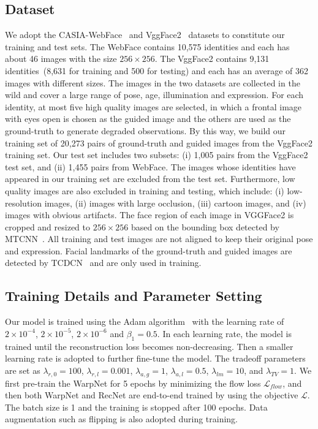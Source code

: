 \documentclass[runningheads]{llncs}
\begin{document}
\subsection{Dataset}
We adopt the CASIA-WebFace~\cite{Webface} and VggFace2~\cite{Vggface2} datasets to constitute our training and test sets.
The WebFace contains 10,575 identities and each has about 46 images with the size $256 \times 256$.
The VggFace2 contains 9,131 identities~(8,631 for training and 500 for testing) and each has an average of 362 images with different sizes.
The images in the two datasets are collected in the wild and cover a large range of pose, age, illumination and expression.
For each identity, at most five high quality images are selected, in which a frontal image with eyes open is chosen as the guided image and the others are used as the ground-truth to generate degraded observations.
By this way, we build our training set of 20,273 pairs of ground-truth and guided images from the VggFace2 training set.
Our test set includes two subsets: (i) 1,005 pairs from the VggFace2 test set, and (ii) 1,455 pairs from WebFace.
The images whose identities have appeared in our training set are excluded from the test set.
Furthermore, low quality images are also excluded in training and testing, which include: (i) low-resolution images, (ii) images with large occlusion, (iii) cartoon images, and (iv) images with obvious artifacts.
The face region of each image in VGGFace2 is cropped and resized to $256 \times 256$ based on the bounding box detected by MTCNN~\cite{MTCNN}.
All training and test images are not aligned to keep their original pose and expression.
Facial landmarks of the ground-truth and guided images are detected by TCDCN~\cite{TCDCN} and are only used in training.

\subsection{Training Details and Parameter Setting}
Our model is trained using the Adam algorithm~\cite{kingma2014adam} with the learning rate of $2 \times {10^{ - 4}}$, $2 \times {10^{ - 5}}$, $2 \times {10^{ - 6}}$  and ${\beta _1} = 0.5$.
In each learning rate, the model is trained until the reconstruction loss becomes non-decreasing.
Then a smaller learning rate is adopted to further fine-tune the model.
The tradeoff parameters are set as $\lambda_{r,0} = 100$, $\lambda_{r,l} = 0.001$, $\lambda_{a,g} = 1$, $\lambda_{a,l} = 0.5$, $\lambda_{lm} = 10$, and $\lambda_{TV} = 1$.
We first pre-train the WarpNet for 5 epochs by minimizing the flow loss $\mathcal{L}_{flow}$, and then both WarpNet and RecNet are end-to-end trained by using the objective $\mathcal{L}$.
The batch size is 1 and the training is stopped after 100 epochs.
Data augmentation such as flipping is also adopted during training.
\end{document}
